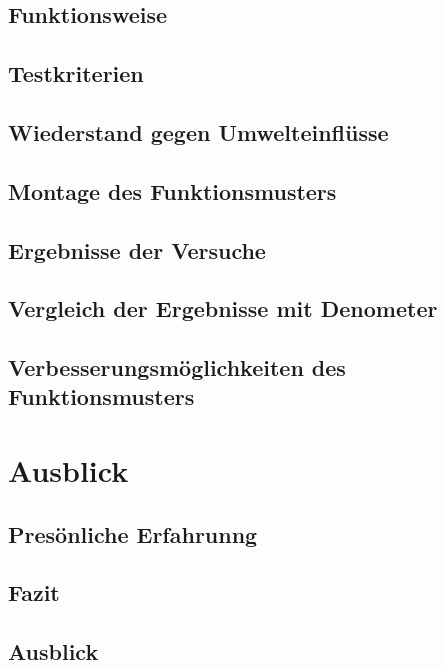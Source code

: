 \documentclass[a4paper,12pt]{article}
\begin{document}
\subsection{Funktionsweise}

\subsection{Testkriterien}

\subsection{Wiederstand gegen Umwelteinflüsse}

\subsection{Montage des Funktionsmusters}

\subsection{Ergebnisse der Versuche}

\subsection{Vergleich der Ergebnisse mit Denometer}

\subsection{Verbesserungsmöglichkeiten des Funktionsmusters}

\newpage
\section{Ausblick}
\subsection{Presönliche Erfahrunng}

\subsection{Fazit}

\subsection{Ausblick}


\newpage
%
\end{document}
